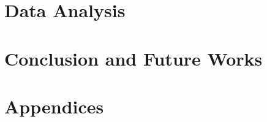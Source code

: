 \documentclass[a4paper,12pt,twoside]{report}
\begin{document}
\begin{onehalfspace}
\clearpage
\chapter{Data Analysis}
\label{c:data-analysis}


%


\clearpage
\chapter{Conclusion and Future Works}
\label{c:conclusion}




\clearpage
	\setcounter{chapter}{1}
	\fancyhf{}
	\rhead{\thepage}
\renewcommand{\thechapter}{\Alph{chapter}}
\chapter*{Appendices}
\label{chap_appendices}


%


\clearpage
	\fancyhf{}
	\rhead{\thepage}
	\lhead{\textbf{ \nouppercase{\leftmark}} }
{}
%
%
\printbibliography

\end{onehalfspace}
\end{document}
